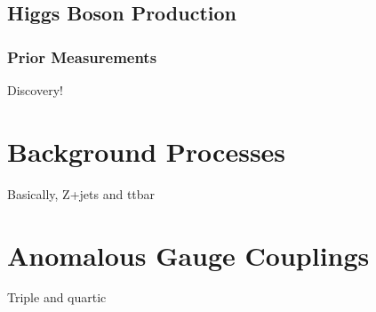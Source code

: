 \subsection{Higgs Boson Production}

\subsubsection{Prior Measurements}
Discovery!



\section{Background Processes}
Basically, Z+jets and ttbar



\section{Anomalous Gauge Couplings}
Triple and quartic
